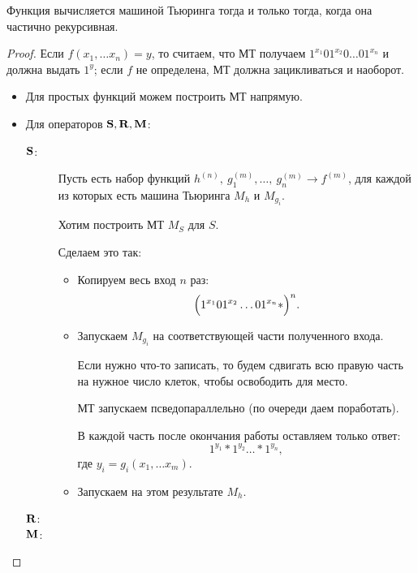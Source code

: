 \begin{thm}
    Функция вычисляется машиной Тьюринга тогда и только тогда, когда она частично рекурсивная.
\end{thm}
\begin{proof}
			Если $ f(x_1, \ldots x_n) = y$, то считаем, что МТ получаем $ 1^{x_1}01^{x_2}0\ldots 01^{x_n}$ и должна выдать $ 1^{y}$; если  $ f$ не определена, МТ должна зацикливаться и наоборот.
    \begin{description}
        \item {} 
			\begin{itemize}
				\item Для простых функций можем построить МТ напрямую.
				\item Для операторов $ \S, \R, \M$:
					\begin{description}
						\item[$ \S$:]
							Пусть есть набор функций $ h^{(n)}, ~ g_1^{(m)}, \ldots , ~ g_n^{(m)} \longrightarrow f^{(m)}$, для каждой из которых есть машина Тьюринга $ M_{h}$ и $ M_{g_{i}}$. 

							Хотим построить МТ $ M_{S}$ для $ S$.

							Сделаем это так:
							\begin{itemize}
								\item Копируем весь вход $ n$ раз:
									\[
										\Bigl(1^{x_1}01^{x_2}\ldots 01^{x_n} \ast \Bigr)^{n}
									.\] 
								\item Запускаем $ M_{g_i}$ на соответствующей части полученного входа. 

							Если нужно что-то записать, то будем сдвигать всю правую часть на нужное число клеток, чтобы освободить для место.

							МТ запускаем  псведопараллельно (по очереди даем поработать).

							В каждой часть после окончания работы оставляем только ответ:
							\[
								1^{y_1}\ast 1^{y_2}\ldots \ast1^{y_n}
							,\] 
							где $ y_i = g_i(x_1, \ldots x_m)$.
						\item Запускаем на этом результате $ M_{h}$.
							\end{itemize}

						\item[$ \R$:]
						\item[$ \M$:]
					\end{description}
			\end{itemize}
        \item {} 
    \end{description} 
\end{proof}

